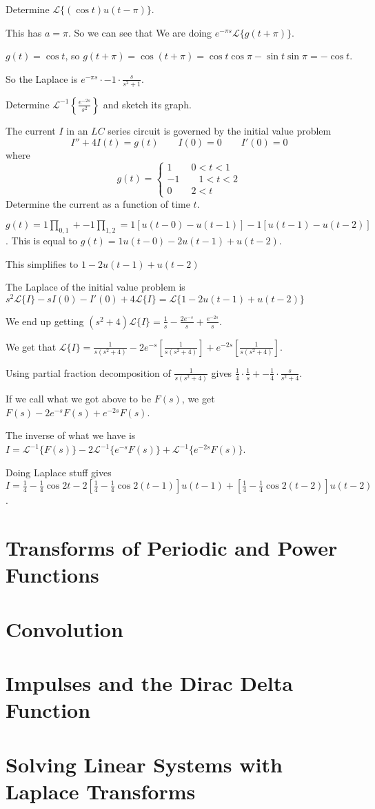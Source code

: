 \documentclass[../diffeq.tex]{subfiles}
\begin{document}
\begin{example}
    Determine $\mathcal{L}\{(\cos t)u(t-\pi)\}$.

    This has $a=\pi$. So we can see that We are doing $e^{-\pi s}\mathcal{L}\{g(t+\pi)\}$.

    $g(t)=\cos t$, so $g(t+\pi)=\cos(t+\pi)=\cos t \cos \pi - \sin t\sin \pi = -\cos t$.

    So the Laplace is $e^{-\pi s}\cdot -1\cdot \frac{s}{s^2+1}$.
\end{example}

\ex Determine $\mathcal{L}^{-1}\left\{\frac{e^{-2s}}{s^2}\right\}$ and sketch its graph.

\begin{example}
    The current $I$ in an $LC$ series circuit is governed by the initial value problem 
    \[ I''+4I(t)=g(t) \qquad I(0)=0 \qquad I'(0)=0 \]
    where 
    \[ g(t)=\begin{cases}
        1 \qquad 0<t<1 \\
        -1 \qquad 1<t<2 \\
        0 \qquad 2<t 
    \end{cases}\]
    Determine the current as a function of time $t$.

    $g(t)=1\prod_{0,1}+-1\prod_{1,2} = 1[u(t-0)-u(t-1)]-1[u(t-1)-u(t-2)]$. This is equal to $g(t)=1u(t-0)-2u(t-1)+u(t-2)$.

    This simplifies to $1-2u(t-1)+u(t-2)$

    The Laplace of the initial value problem is $s^2\mathcal{L}\{I\}-sI(0)-I'(0)+4\mathcal{L}\{I\}=\mathcal{L}\{1-2u(t-1)+u(t-2)\}$

    We end up getting $(s^2+4)\mathcal{L}\{I\}=\frac{1}{s}-\frac{2e^{-s}}{s}+\frac{e^{-2s}}{s}$.

    We get that $\mathcal{L}\{I\} = \frac{1}{s(s^2+4)}-2e^{-s}\left[\frac{1}{s(s^2+4)}\right]+e^{-2s}\left[\frac{1}{s(s^2+4)}\right]$.

    Using partial fraction decomposition of $\frac{1}{s(s^2+4)}$ gives $\frac{1}{4}\cdot \frac{1}{s}+-\frac{1}{4}\cdot \frac{s}{s^2+4}$.

    If we call what we got above to be $F(s)$, we get $F(s)-2e^{-s}F(s)+e^{-2s}F(s)$.

    The inverse of what we have is $I=\mathcal{L}^{-1}\{F(s)\}-2\mathcal{L}^{-1}\{e^{-s}F(s)\}+\mathcal{L}^{-1}\{e^{-2s}F(s)\}$.

    Doing Laplace stuff gives $I=\frac{1}{4}-\frac{1}{4}\cos 2t - 2\left[\frac{1}{4}-\frac{1}{4}\cos 2(t-1)\right]u(t-1)+\left[\frac{1}{4}-\frac{1}{4}\cos 2(t-2)\right]u(t-2)$.
\end{example}

\section{Transforms of Periodic and Power Functions}
\section{Convolution}
\section{Impulses and the Dirac Delta Function}
\section{Solving Linear Systems with Laplace Transforms}
\end{document}
